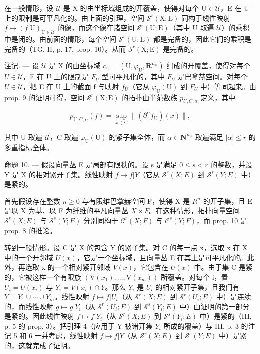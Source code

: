 在一般情形，设 \(\mathcal{U}\) 是 X 的由坐标域组成的开覆盖，使得对每个 \(\mathrm{U} \in \mathcal{U}\)，E 在 U 上的限制是可平凡化的。由上面的引理，空间 \(\mathcal{S}^r(\mathrm{X};\mathrm{E})\) 同构于线性映射 \(f \mapsto (f|\mathrm{U})_{\mathrm{U} \in \mathcal{U}}\) 的像，而这个像在诸空间 \(\mathcal{S}^r(\mathrm{U};\mathrm{E})\)（其中 U 取遍 \(\mathcal{U}\)）的乘积中是闭的。由前面的情形，每个空间 \(\mathcal{S}^r(\mathrm{U};\mathrm{E})\) 都是完备的，因此它们的乘积是完备的（TG, II, p. 17, prop. 10）。从而 \(\mathcal{S}^r(\mathrm{X};\mathrm{E})\) 是完备的。

注记. --- 设 \(\mathcal{U}\) 是 X 的由坐标域 \(c_{\mathrm{U}} = (\mathrm{U}, \varphi_{\mathrm{U}}, \mathbf{R}^{n_{\mathrm{U}}})\) 组成的开覆盖，使得对每个 \(U \in \mathcal{U}\)，E 在 U 上的限制是 \(F_{U}\) 型可平凡化的，其中 \(F_{U}\) 是巴拿赫空间。对每个 \(U \in \mathcal{U}\)，把 E 在 U 上的截面 f 与映射 \(f_{U}\)（它从 \(\varphi_{\mathrm{U}}(\mathrm{U})\) 到 \(F_{U}\) 中）等同起来。由 prop. 9 的证明可得，空间 \(\mathcal{S}^{r}(\mathrm{X};\mathrm{E})\) 的拓扑由半范数族 \(p_{U,C,\alpha}\) 定义，其中

\[
p _ {\mathrm{U,C}, \alpha} (f) = \sup _ {x \in \mathrm{C}} \| (\partial^ {\alpha} f _ {\mathrm{U}}) (x) \|,
\]

其中 U 取遍 \(\mathcal{U}\)，C 取遍 \(\varphi_{\mathrm{U}}(\mathrm{U})\) 的紧子集全体，而 \(\alpha \in \mathbf{N}^{n_{\mathrm{U}}}\) 取遍满足 \(|\alpha| \leqslant r\) 的多重指标全体。

命题 10. --- 假设向量丛 E 是局部有限秩的。设 s 是满足 \(0 \leqslant s < r\) 的整数，并设 Y 是 X 的相对紧开子集。线性映射 \(f \mapsto f|Y\)（它从 \(\mathcal{S}^{r}(X;E)\) 到 \(\mathcal{S}^{s}(Y;E)\) 中）是紧的。

首先假设存在整数 \(n \geqslant 0\) 与有限维巴拿赫空间 F，使得 X 是 \(R^{n}\) 的开子集，且 E 是以 X 为基、以 F 为纤维的平凡向量丛 \(X \times F\)。在这种情形，拓扑向量空间 \(\mathcal{S}^{r}(X;E)\) 与 \(\mathcal{S}^{s}(Y;E)\) 分别同构于 \(\mathcal{C}^{r}(X;F)\) 与 \(\mathcal{C}^{s}(Y;F)\)，而 prop. 10 是 prop. 8 的推论。

转到一般情形。设 C 是 X 的包含 Y 的紧子集。对 C 的每一点 x，选取 x 在 X 中的一个开邻域 \(U(x)\)，它是一个坐标域，且向量丛 E 在其上是可平凡化的。此外，再选取 x 的一个相对紧开邻域 \(V(x)\)，它包含在 \(U(x)\) 中。由于集 C 是紧的，它被这样一个有限族 \((\mathrm{V}(x_{1}),\ldots,\mathrm{V}(x_{m}))\) 所覆盖。对每个 i，置 \(U_{i}=U(x_{i})\) 与 \(Y_{i}=V(x_{i})\cap Y\)。那么 \(Y_{i}\) 是 \(U_{i}\) 的相对紧开子集，且我们有 \(Y=Y_{1}\cup\cdots\cup Y_{m}\)。线性映射 \(f\mapsto f|U_{i}\)（从 \(\mathcal{S}^{r}(X;E)\) 到 \(\mathcal{S}^{r}(U_{i};E)\) 中）是连续的，而线性映射 \(g\mapsto g|Y_{i}\)（从 \(\mathcal{S}^{r}(U_{i};E)\) 到 \(\mathcal{S}^{s}(Y_{i};E)\) 中）由证明的第一部分是紧的。因此线性映射 \(f\mapsto f|Y_{i}\)（从 \(\mathcal{S}^{r}(X;E)\) 到 \(\mathcal{S}^{s}(Y_{i};E)\) 中）是紧的（III, p. 5 的 prop. 3）。把引理 4（应用于 Y 被诸开集 \(Y_{i}\) 所成的覆盖）与 III, p. 3 的注记 5 和 6 一并考虑，线性映射 \(f\mapsto f|Y\)（从 \(\mathcal{S}^{r}(X;E)\) 到 \(\mathcal{S}^{s}(Y;E)\) 中）是紧的，这就完成了证明。

